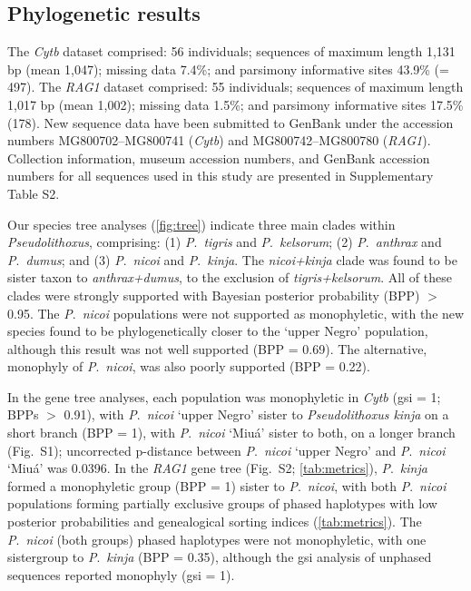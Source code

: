 \documentclass[12pt]{article}
\begin{document}
\subsection*{Phylogenetic results}

The \emph{Cytb} dataset comprised: 56 individuals; sequences of maximum length 1,131 bp (mean 1,047); missing data 7.4\%; and parsimony informative sites 43.9\% (= 497). %
The \emph{RAG1} dataset comprised: 55 individuals; sequences of maximum length 1,017 bp (mean 1,002); missing data 1.5\%; and parsimony informative sites 17.5\% (178). %
New sequence data have been submitted to GenBank under the accession numbers MG800702--MG800741 (\emph{Cytb}) and MG800742--MG800780 (\emph{RAG1}). %
Collection information, museum accession numbers, and GenBank accession numbers for all sequences used in this study are presented in Supplementary Table S2.%

Our species tree analyses (\autoref{fig:tree}) indicate three main clades within \emph{Pseudolithoxus}, comprising: (1) \emph{P}.\ \emph{tigris} and \emph{P}.\ \emph{kelsorum}; (2) \emph{P}.\ \emph{anthrax} and \emph{P}.\ \emph{dumus}; and (3) \emph{P}.\ \emph{nicoi} and \emph{P}.\ \emph{kinja}. %
The \emph{nicoi+kinja} clade was found to be sister taxon to \emph{anthrax+dumus}, to the exclusion of \emph{tigris+kelsorum}. %
All of these clades were strongly supported with Bayesian posterior probability (BPP) $>$ 0.95. %
The \emph{P}.\ \emph{nicoi} populations were not supported as monophyletic, with the new species found to be phylogenetically closer to the `upper Negro' population, although this result was not well supported (BPP = 0.69). %
The alternative, monophyly of \emph{P}.\ \emph{nicoi}, was also poorly supported (BPP = 0.22).%

In the gene tree analyses, each population was monophyletic in \emph{Cytb} (gsi = 1; BPPs $>$ 0.91), with \emph{P}.\ \emph{nicoi} `upper Negro' sister to \emph{Pseudolithoxus kinja} on a short branch (BPP = 1), with \emph{P}.\ \emph{nicoi} `Miuá' sister to both, on a longer branch (Fig.\ S1); uncorrected p-distance between \emph{P}.\ \emph{nicoi} `upper Negro' and \emph{P}.\ \emph{nicoi} `Miuá' was 0.0396. %
In the \emph{RAG1} gene tree (Fig.\ S2; \autoref{tab:metrics}), \emph{P}.\ \emph{kinja} formed a monophyletic group (BPP = 1) sister to \emph{P}.\ \emph{nicoi}, with both \emph{P}.\ \emph{nicoi} populations forming partially exclusive groups of phased haplotypes with low posterior probabilities and genealogical sorting indices (\autoref{tab:metrics}). %
The \emph{P}.\ \emph{nicoi} (both groups) phased haplotypes were not monophyletic, with one sistergroup to \emph{P}.\ \emph{kinja} (BPP = 0.35), although the gsi analysis of unphased sequences reported monophyly (gsi = 1).%
\end{document}
